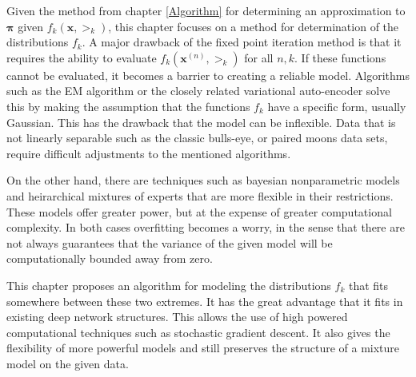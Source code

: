 Given the method from chapter \ref{Algorithm} for determining an approximation to \( \bm\pi \) given \( f_k(\bm x,\bm\gt_k) \), this chapter focuses on a method for determination of the distributions \( f_k \). A major drawback of the fixed point iteration method is that it requires the ability to evaluate $f_k(\bm x^{(n)},\bm\gt_k)$ for all $n,k$.  If these functions cannot be evaluated, it becomes a barrier to creating a reliable model.  Algorithms such as the EM algorithm or the closely related variational auto-encoder \cite{kingma2013auto,van2017neural} solve this by making the assumption that the functions $f_k$ have a specific form, usually Gaussian. This has the drawback that the model can be inflexible. Data that is not linearly separable such as the classic bulls-eye, or paired moons data sets, require difficult adjustments to the mentioned algorithms.

On the other hand, there are techniques such as bayesian nonparametric models and
heirarchical mixtures of experts that are more flexible in their restrictions.  These
models offer greater power, but at the expense of greater computational complexity.  In
both cases overfitting becomes a worry, in the sense that there are not always guarantees that 
the variance of the given model will be computationally bounded away from zero.

This chapter proposes an algorithm for modeling the distributions $f_k$ that fits somewhere between these two
extremes. It has the great advantage that it fits in existing deep network structures. 
This allows the use of high powered computational techniques such as stochastic gradient
descent. It also gives the flexibility of more powerful models and still preserves
the structure of a mixture model on the given data.

